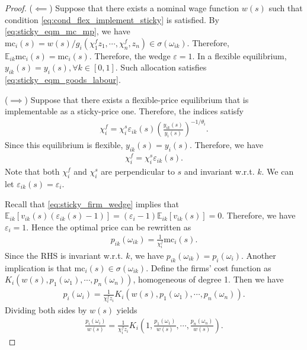 \documentclass[12pt]{article}
\numberwithin{equation}{section}
\begin{document}
\begin{proof}
    ($\impliedby$) Suppose that there exists a nominal wage function $w(s)$ such that condition \eqref{eq:cond_flex_implement_sticky} is satisfied. By \eqref{eq:sticky_eqm_mc_mp}, we have $\text{mc}_i(s) = w(s)/g_i(\chi_1^f z_1, \cdots, \chi_n^f, z_n) \in \sigma(\omega_{ik})$. Therefore, $\mathbb{E}_{ik} \text{mc}_i(s) = \text{mc}_{i}(s)$. Therefore, the wedge $\varepsilon = 1$. In a flexible equilibrium, $y_{ik}(s) = y_i(s), \forall k\in[0,1]$. Such allocation satisfies \eqref{eq:sticky_eqm_goods_labour}.

    ($\implies$) Suppose that there exists a flexible-price equilibrium that is implementable as a sticky-price one. Therefore, the indices satisfy
    \begin{align*}
        \chi_i^f = \chi_i^s \varepsilon_{ik}(s) \left(\frac{y_{ik}(s)}{y_i(s)}\right)^{-1/\theta_i}.
    \end{align*}
    Since this equilibrium is flexible, $y_{ik}(s) = y_i(s)$. Therefore, we have
    \begin{align*}
        \chi_i^f = \chi_i^s \varepsilon_{ik}(s).
    \end{align*}
    Note that both $\chi_i^f$ and $\chi_i^s$ are perpendicular to $s$ and invariant w.r.t. $k$. We can let $\varepsilon_{ik}(s) = \varepsilon_i$.

    Recall that \eqref{eq:sticky_firm_wedge} implies that $\mathbb{E}_{ik}[v_{ik}(s)(\varepsilon_{ik}(s) - 1)] = (\varepsilon_i - 1)\mathbb{E}_{ik}[v_{ik}(s)] = 0$. Therefore, we have $\varepsilon_i = 1$. Hence the optimal price can be rewritten as
    \begin{align*}
        p_{ik}(\omega_{ik}) = \frac{1}{\chi_i^f} \text{mc}_i(s).
    \end{align*}
    Since the RHS is invariant w.r.t. $k$, we have $p_{ik}(\omega_{ik}) = p_i(\omega_i)$.  Another implication is that $\text{mc}_i(s) \in \sigma(\omega_{ik})$. Define the firms' cost function as $K_i(w(s), p_1(\omega_1), \cdots, p_n(\omega_n))$, homogeneous of degree 1. Then we have
    \begin{align}\label{eq:implementability_cond}
        p_i(\omega_i) = \frac{1}{\chi_i^f z_i}K_i(w(s), p_1(\omega_1), \cdots, p_n(\omega_n)).
    \end{align}
    Dividing both sides by $w(s)$ yields
    \begin{align*}
        \frac{p_i(\omega_i)}{w(s)} = \frac{1}{\chi_i^f z_i}K_i\left(1, \frac{p_{1}(\omega_1)}{w(s)} , \cdots, \frac{p_{n}(\omega_n)}{w(s)} \right).
    \end{align*}


\end{proof}
\end{document}
